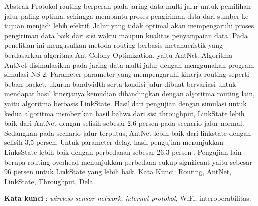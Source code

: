 \documentclass{jtetiproposalskripsi}
\begin{document}
\cover

\approvalpage


\begin{abstractind}
Abstrak Protokol  routing  berperan  pada  jaring data  multi  jalur  untuk  pemilihan  jalur  paling optimal sehingga membantu proses pengiriman data dari  sumber  ke  tujuan  menjadi  lebih  efektif.  Jalur yang  tidak  optimal  akan  mempengaruhi  proses pengiriman  data  baik  dari  sisi  waktu  maupun kualitas  penyampaian  data.  Pada  penelitian  ini mengusulkan metoda  routing berbasis metahueristik yang  berdasarkan  algoritma  Ant  Colony Optimization,  yaitu  AntNet.    Algoritma  AntNet disimulasikan  pada  jaring  data  multi  jalur  dengan menggunakan  program  simulasi  NS-2.  Parameter-parameter  yang  mempengaruhi  kinerja  routing seperti  beban  packet,  ukuran  bandwidth  serta kondisi jalur dibuat bervariasi untuk mendapat hasil kinerjanya  kemudian  dibandingkan  dengan algoritma  routing  lain,  yaitu  algoritma  berbasis LinkState.  Hasil  dari  pengujian  dengan  simulasi  untuk  kedua algoritma  memberikan  hasil  bahwa  dari  sisi throughput, LinkState lebih baik dari AntNet dengan selisih  sebesar  2,6 persen  pada  scenario  jalur  normal. Sedangkan  pada  scenario  jalur  terputus,  AntNet lebih baik dari  linkstate dengan selisih 3,5 persen. Untuk parameter  delay,  hasil  pengujian  menunjukkan LinksState  lebih  baik  dengan  perbedaaan  sebesar 26,3 persen  .  Pengujian  lain  berupa  routing  overhead menunjukkan  perbedaan  cukup  significant  yaitu sebesar 96 persen untuk LinkState yang lebih baik. Kata  Kunci:  Routing,  AntNet,  LinkState, Throughput, Dela


\bigskip
\textbf{Kata kunci} : \emph{wireless sensor network}, \emph{internet protokol}, WiFi, interoperabilitas.
\end{abstractind}

\tableofcontents
{}
\clearpage{}\setcounter{page}{1}
\end{document}
